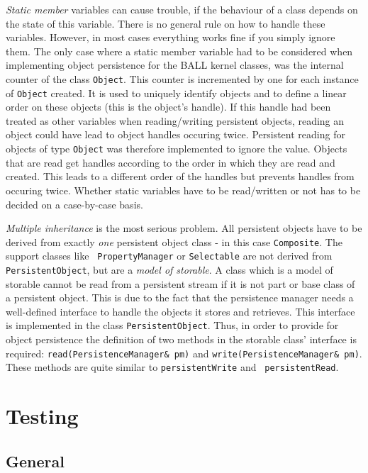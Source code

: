 \documentclass[a4paper,10pt]{article}
\begin{document}
{\em Static member} variables can cause trouble, if the behaviour of a class depends
on the state of this variable. There is no general rule on how to handle these
variables. However, in most cases everything works fine if you simply ignore
them. The only case where a static member variable had to be considered when
implementing object persistence for the BALL kernel classes, was the internal
counter of the class {\tt Object}. This counter is incremented by one for each
instance of {\tt Object} created. It is used to uniquely identify objects and
to define a linear order on these objects (this is the object's handle).
If this handle had been treated as other variables when reading/writing persistent objects,
reading an object could have lead to object handles occuring twice. 
Persistent reading for objects of type {\tt Object} 
was therefore implemented to ignore the value. Objects that are read get handles according
to the order in which they are read and created. This leads to a different order
of the handles but prevents handles from occuring twice.
Whether static variables have to be read/written or not has to be
decided on a case-by-case basis.

{\em Multiple inheritance} is the most serious problem. 
All persistent objects have to be derived from exactly {\em one} persistent
object class - in this case {\tt Composite}. The support classes like {\tt
PropertyManager} or {\tt Selectable} are not derived from {\tt
PersistentObject}, but are a {\em model of storable}. 
A class which is a model of storable cannot be read from a persistent stream
if it is not part or base class of a persistent object. This is due to the fact
that the persistence manager needs a well-defined interface to handle the
objects it stores and retrieves. This interface is implemented in the class
{\tt PersistentObject}. 
Thus, in order to provide for object persistence 
the definition of two methods in the storable class' interface is required:
{\tt read(PersistenceManager\& pm)} and {\tt write(PersistenceManager\& pm)}.
These methods are quite similar to {\tt persistentWrite} and {\tt
persistentRead}.

\section{Testing}

\subsection{General}
\end{document}
